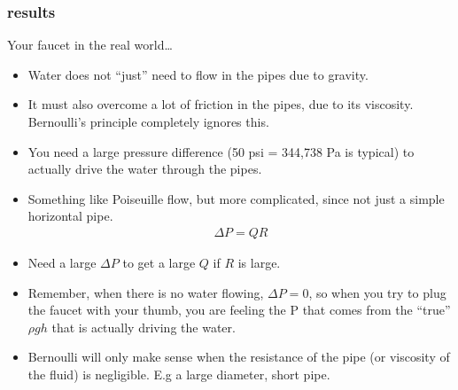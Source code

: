 \documentclass[aspectratio=169,
hyperref={colorlinks,urlcolor=blue}
]{beamer}
\begin{document}
\subsubsection{results}
\label{subsubsec:results}
\begin{frame}{Your faucet in the real world…}
\begin{itemize}
\item Water does not ``just'' need to flow in the pipes due to gravity. 
\item It must also overcome a lot of friction in the pipes, due to its viscosity. Bernoulli’s principle completely ignores this.
\item You need a large pressure difference (50 psi  = 344,738 Pa is typical) to actually drive the water through the pipes. 
\item Something like Poiseuille flow, but more complicated, since not just a simple horizontal pipe. 
\begin{align*}
\Delta P =QR
\end{align*}
\item Need a large $\Delta P$ to get a large $Q$ if $R$ is large.
\item Remember, when there is no water flowing, $\Delta P=0$, so when you try to plug the faucet with your thumb, you are feeling the P that comes from the ``true'' $\rho g h$  that is actually driving the water. 
\item Bernoulli will only make sense when the resistance of the pipe (or viscosity of the fluid) is negligible. E.g a large diameter, short pipe. 
\end{itemize}

\end{frame}

\end{document}
